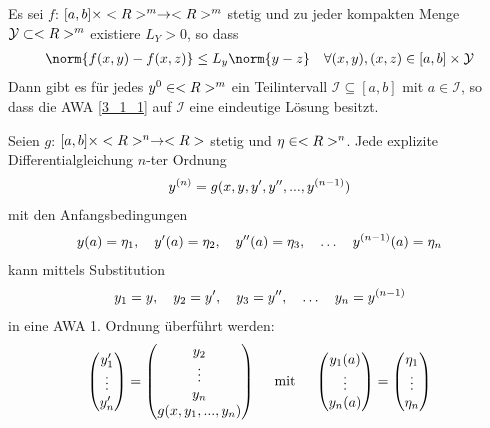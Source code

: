 \begin{proposition}
	Es sei $f$: $[a,b] \times \R^m \to \R^m$ stetig und zu jeder kompakten Menge $\mathcal{Y} \subset \R^m$ existiere $L_Y > 0$, so dass
	\begin{align}
		\norm{f(x,y)-f(x,z)} \le L_y \norm{y-z} \quad \forall (x,y),(x,z) \in [a,b] \times \mathcal{Y} \notag
	\end{align}
	Dann gibt es für jedes $y^0 \in \R^m$ ein Teilintervall $\mathcal{I} \subseteq [a,b]$ mit $a \in \mathcal{I}$, so dass die AWA \cref{3_1_1} auf $\mathcal{I}$ eine eindeutige Lösung besitzt.
\end{proposition}

Seien $g$: $[a,b]\times \R^n \to \R$ stetig und $\eta \in \R^n$. Jede explizite Differentialgleichung $n$-ter Ordnung
\begin{align}
	y^{(n)} = g(x,y,y',y'',...,y^{(n-1)})\notag
\end{align}
mit den Anfangsbedingungen
\begin{align}
	y(a) = \eta_1, \quad y'(a) = \eta_2, \quad y''(a) = \eta_3, \quad \dots \quad y^{(n-1)}(a) = \eta_n\notag
\end{align}
kann mittels Substitution
\begin{align}
	y_1 = y,\quad y_2=y', \quad y_3=y'', \quad \dots \quad y_n = y^{(n-1)}\notag
\end{align}
in eine AWA 1. Ordnung überführt werden:
\begin{align}
	\begin{pmatrix}
		y_1' \\ \vdots \\ y_n'
	\end{pmatrix} = 
	\begin{pmatrix}
		y_2 \\ \vdots \\ y_n \\ g(x,y_1,...,y_n)
	\end{pmatrix} 
	\quad \mit \quad 
	\begin{pmatrix}
	y_1(a) \\ \vdots \\ y_n(a)
	\end{pmatrix} = 
	\begin{pmatrix}
	\eta_1 \\ \vdots \\ \eta_n
	\end{pmatrix} \notag
\end{align}
